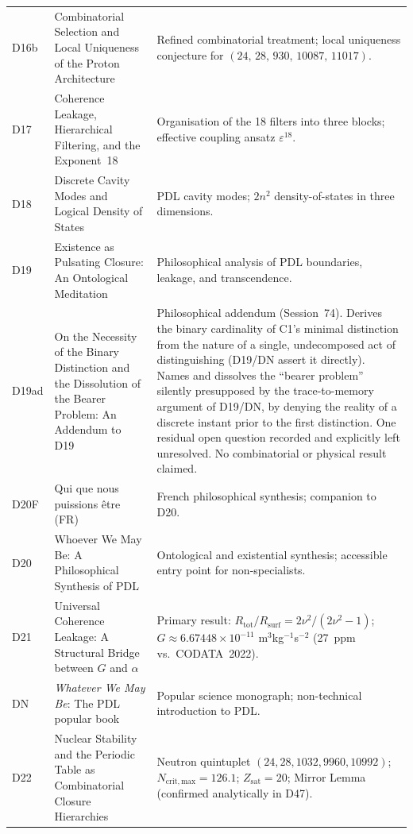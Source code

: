 \documentclass[11pt,a4paper]{article}
\theoremstyle{plain}
\theoremstyle{definition}
\theoremstyle{remark}
\newcommand{\quintuplet}{(24,\,28,\,930,\,10087,\,11017)}
\begin{document}
\begin{longtable}{L{1.3cm}L{3.8cm}L{8.0cm}}
D16b & Combinatorial Selection and Local Uniqueness of the Proton Architecture~\cite{D16b} & Refined combinatorial treatment; local uniqueness conjecture for $\quintuplet$.\\[0.3em]
D17 & Coherence Leakage, Hierarchical Filtering, and the Exponent~18~\cite{D17} & Organisation of the 18 filters into three blocks; effective coupling ansatz $\varepsilon^{18}$.\\[0.3em]
D18 & Discrete Cavity Modes and Logical Density of States~\cite{D18} & PDL cavity modes; $2n^2$ density-of-states in three dimensions.\\[0.3em]
D19 & Existence as Pulsating Closure: An Ontological Meditation~\cite{D19} & Philosophical analysis of PDL boundaries, leakage, and transcendence.\\[0.3em]
D19ad & On the Necessity of the Binary Distinction and the Dissolution of the Bearer Problem: An Addendum to D19~\cite{D19ad} & Philosophical addendum (Session~74). Derives the binary cardinality of C1's minimal distinction from the nature of a single, undecomposed act of distinguishing (D19/DN assert it directly). Names and dissolves the ``bearer problem'' silently presupposed by the trace-to-memory argument of D19/DN, by denying the reality of a discrete instant prior to the first distinction. One residual open question recorded and explicitly left unresolved. No combinatorial or physical result claimed.\\[0.3em]
D20F & Qui que nous puissions \^etre (FR)~\cite{D20F} & French philosophical synthesis; companion to D20.\\[0.3em]
D20 & Whoever We May Be: A Philosophical Synthesis of PDL~\cite{D20} & Ontological and existential synthesis; accessible entry point for non-specialists.\\[0.3em]
D21 & Universal Coherence Leakage: A Structural Bridge between $G$ and $\alpha$~\cite{D21} & \textcolor{proofblue}{Primary result}: $R_{\mathrm{tot}}/R_{\mathrm{surf}} = 2\nu^2/(2\nu^2-1)$; $G \approx 6.67448\times 10^{-11}$ m$^3$kg$^{-1}$s$^{-2}$ (27~ppm vs.\ CODATA~2022).\\[0.3em]
DN & \emph{Whatever We May Be}: The PDL popular book~\cite{DN} & Popular science monograph; non-technical introduction to PDL.\\[0.3em]
D22 & Nuclear Stability and the Periodic Table as Combinatorial Closure Hierarchies~\cite{D22} & Neutron quintuplet $(24,28,1032,9960,10992)$; $N_{\mathrm{crit,max}}=126.1$; $Z_{\mathrm{sat}}=20$; Mirror Lemma (confirmed analytically in D47).\\[0.3em]

\end{longtable}
\end{document}
